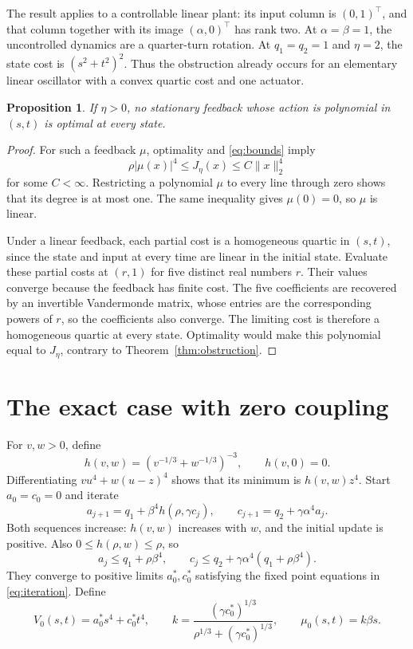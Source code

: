 \documentclass[10pt]{article}
\newtheorem{proposition}{Proposition}
\begin{document}
The result applies to a controllable linear plant: its input column is $(0,1)^\top$, and that column together with its image $(\alpha,0)^\top$ has rank two. At $\alpha=\beta=1$, the uncontrolled dynamics are a quarter-turn rotation. At $q_1=q_2=1$ and $\eta=2$, the state cost is $(s^2+t^2)^2$. Thus the obstruction already occurs for an elementary linear oscillator with a convex quartic cost and one actuator.

\begin{proposition}
If $\eta>0$, no stationary feedback whose action is polynomial in $(s,t)$ is optimal at every state.
\label{prop:feedback}
\end{proposition}
\begin{proof}
For such a feedback $\mu$, optimality and \eqref{eq:bounds} imply
\[
 \rho|\mu(x)|^4\leq J_\eta(x)\leq C\|x\|_2^4
\]
for some $C<\infty$. Restricting a polynomial $\mu$ to every line through zero shows that its degree is at most one. The same inequality gives $\mu(0)=0$, so $\mu$ is linear.

Under a linear feedback, each partial cost is a homogeneous quartic in $(s,t)$, since the state and input at every time are linear in the initial state. Evaluate these partial costs at $(r,1)$ for five distinct real numbers $r$. Their values converge because the feedback has finite cost. The five coefficients are recovered by an invertible Vandermonde matrix, whose entries are the corresponding powers of $r$, so the coefficients also converge. The limiting cost is therefore a homogeneous quartic at every state. Optimality would make this polynomial equal to $J_\eta$, contrary to Theorem~\ref{thm:obstruction}.
\end{proof}

\section{The exact case with zero coupling}

For $v,w>0$, define
\begin{equation}
 h(v,w)=(v^{-1/3}+w^{-1/3})^{-3},\qquad h(v,0)=0.
 \label{eq:h}
\end{equation}
Differentiating $vu^4+w(u-z)^4$ shows that its minimum is $h(v,w)z^4$. Start $a_0=c_0=0$ and iterate
\begin{equation}
 a_{j+1}=q_1+\beta^4h(\rho,\gamma c_j),\qquad
 c_{j+1}=q_2+\gamma\alpha^4a_j.
 \label{eq:iteration}
\end{equation}
Both sequences increase: $h(v,w)$ increases with $w$, and the initial update is positive. Also $0\leq h(\rho,w)\leq\rho$, so
\[
 a_j\leq q_1+\rho\beta^4,\qquad
 c_j\leq q_2+\gamma\alpha^4(q_1+\rho\beta^4).
\]
They converge to positive limits $a_0^*,c_0^*$ satisfying the fixed point equations in \eqref{eq:iteration}. Define
\begin{equation}
 V_0(s,t)=a_0^*s^4+c_0^*t^4,\qquad
 k=\frac{(\gamma c_0^*)^{1/3}}{\rho^{1/3}+(\gamma c_0^*)^{1/3}},
 \qquad \mu_0(s,t)=k\beta s.
 \label{eq:baseline}
\end{equation}
\end{document}
